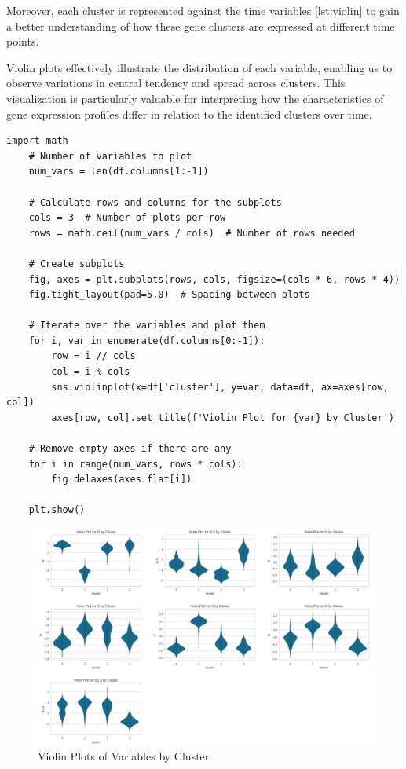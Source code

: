 \documentclass{article}
\begin{document}
Moreover, each cluster is represented against the time variables \ref{lst:violin} to gain a better understanding of how these gene clusters are expressed at different time points.

Violin plots effectively illustrate the distribution of each variable, enabling us to observe variations in central tendency and spread across clusters. This visualization is particularly valuable for interpreting how the characteristics of gene expression profiles differ in relation to the identified clusters over time.

\begin{lstlisting}[style=mypython, caption=Violin Plots of Variables by Cluster, label=lst:violin]
	import math
	# Number of variables to plot
	num_vars = len(df.columns[1:-1])
	
	# Calculate rows and columns for the subplots
	cols = 3  # Number of plots per row
	rows = math.ceil(num_vars / cols)  # Number of rows needed
	
	# Create subplots
	fig, axes = plt.subplots(rows, cols, figsize=(cols * 6, rows * 4))
	fig.tight_layout(pad=5.0)  # Spacing between plots
	
	# Iterate over the variables and plot them
	for i, var in enumerate(df.columns[0:-1]):
		row = i // cols
		col = i % cols
		sns.violinplot(x=df['cluster'], y=var, data=df, ax=axes[row, col])
		axes[row, col].set_title(f'Violin Plot for {var} by Cluster')
	
	# Remove empty axes if there are any
	for i in range(num_vars, rows * cols):
		fig.delaxes(axes.flat[i])
	
	plt.show()
\end{lstlisting}

\begin{figure}[H]
	\centering
	\includegraphics[width=\textwidth]{images/violin.png}
	\caption{Violin Plots of Variables by Cluster}
	\label{fig:violin_plots}
\end{figure}
\end{document}
